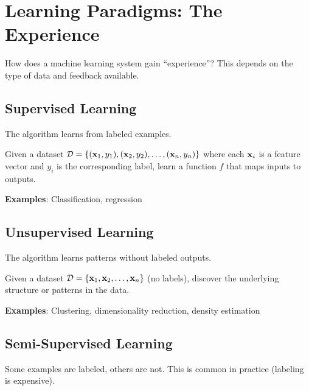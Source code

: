 
\section{Learning Paradigms: The Experience}

How does a machine learning system gain ``experience''? This depends on the type of data and feedback available.

\subsection{Supervised Learning}

The algorithm learns from labeled examples.

\begin{definitionbox}
Given a dataset $\mathcal{D} = \{(\mathbf{x}_1, y_1), (\mathbf{x}_2, y_2), \ldots, (\mathbf{x}_n, y_n)\}$ where each $\mathbf{x}_i$ is a feature vector and $y_i$ is the corresponding label, learn a function $f$ that maps inputs to outputs.
\end{definitionbox}

\textbf{Examples}: Classification, regression

\subsection{Unsupervised Learning}

The algorithm learns patterns without labeled outputs.

\begin{definitionbox}
Given a dataset $\mathcal{D} = \{\mathbf{x}_1, \mathbf{x}_2, \ldots, \mathbf{x}_n\}$ (no labels), discover the underlying structure or patterns in the data.
\end{definitionbox}

\textbf{Examples}: Clustering, dimensionality reduction, density estimation

\subsection{Semi-Supervised Learning}

Some examples are labeled, others are not. This is common in practice (labeling is expensive).

